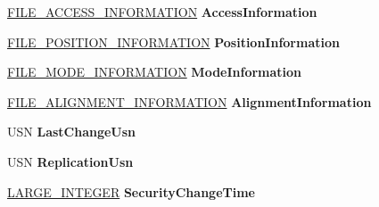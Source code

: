 \begin{DoxyCompactItemize}
\mbox{\label{struct___f_i_l_e___o_l_e___a_l_l___i_n_f_o_r_m_a_t_i_o_n_a5894b88ad284d9c136c594796534f694}} 
\hyperlink{struct___f_i_l_e___a_c_c_e_s_s___i_n_f_o_r_m_a_t_i_o_n}{F\+I\+L\+E\+\_\+\+A\+C\+C\+E\+S\+S\+\_\+\+I\+N\+F\+O\+R\+M\+A\+T\+I\+ON} {\bfseries Access\+Information}
\item 
\mbox{\label{struct___f_i_l_e___o_l_e___a_l_l___i_n_f_o_r_m_a_t_i_o_n_a658d52a40cf9700b6c9aaffd5f66b552}} 
\hyperlink{struct___f_i_l_e___p_o_s_i_t_i_o_n___i_n_f_o_r_m_a_t_i_o_n}{F\+I\+L\+E\+\_\+\+P\+O\+S\+I\+T\+I\+O\+N\+\_\+\+I\+N\+F\+O\+R\+M\+A\+T\+I\+ON} {\bfseries Position\+Information}
\item 
\mbox{\label{struct___f_i_l_e___o_l_e___a_l_l___i_n_f_o_r_m_a_t_i_o_n_afeca8854ba41f3aa4d6169d9e3f8c465}} 
\hyperlink{struct___f_i_l_e___m_o_d_e___i_n_f_o_r_m_a_t_i_o_n}{F\+I\+L\+E\+\_\+\+M\+O\+D\+E\+\_\+\+I\+N\+F\+O\+R\+M\+A\+T\+I\+ON} {\bfseries Mode\+Information}
\item 
\mbox{\label{struct___f_i_l_e___o_l_e___a_l_l___i_n_f_o_r_m_a_t_i_o_n_aa024f7b2e527312068b94a46f543a9f0}} 
\hyperlink{struct___f_i_l_e___a_l_i_g_n_m_e_n_t___i_n_f_o_r_m_a_t_i_o_n}{F\+I\+L\+E\+\_\+\+A\+L\+I\+G\+N\+M\+E\+N\+T\+\_\+\+I\+N\+F\+O\+R\+M\+A\+T\+I\+ON} {\bfseries Alignment\+Information}
\item 
\mbox{\label{struct___f_i_l_e___o_l_e___a_l_l___i_n_f_o_r_m_a_t_i_o_n_acd08394f3d037bf73718ca7e0dad9ae5}} 
U\+SN {\bfseries Last\+Change\+Usn}
\item 
\mbox{\label{struct___f_i_l_e___o_l_e___a_l_l___i_n_f_o_r_m_a_t_i_o_n_a87604517e093bcd92b5aee0fe5337340}} 
U\+SN {\bfseries Replication\+Usn}
\item 
\mbox{\label{struct___f_i_l_e___o_l_e___a_l_l___i_n_f_o_r_m_a_t_i_o_n_a65544df47048b78e1ea0b6a30203cc0c}} 
\hyperlink{union___l_a_r_g_e___i_n_t_e_g_e_r}{L\+A\+R\+G\+E\+\_\+\+I\+N\+T\+E\+G\+ER} {\bfseries Security\+Change\+Time}

\end{DoxyCompactItemize}
